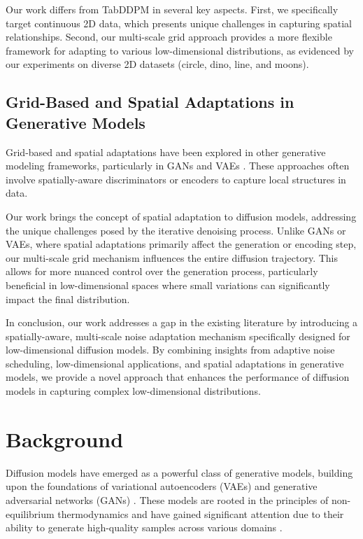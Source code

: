 \documentclass{article} %
\begin{document}
Our work differs from TabDDPM in several key aspects. First, we specifically target continuous 2D data, which presents unique challenges in capturing spatial relationships. Second, our multi-scale grid approach provides a more flexible framework for adapting to various low-dimensional distributions, as evidenced by our experiments on diverse 2D datasets (circle, dino, line, and moons).

\subsection{Grid-Based and Spatial Adaptations in Generative Models}

Grid-based and spatial adaptations have been explored in other generative modeling frameworks, particularly in GANs \cite{gan} and VAEs \cite{vae}. These approaches often involve spatially-aware discriminators or encoders to capture local structures in data.

Our work brings the concept of spatial adaptation to diffusion models, addressing the unique challenges posed by the iterative denoising process. Unlike GANs or VAEs, where spatial adaptations primarily affect the generation or encoding step, our multi-scale grid mechanism influences the entire diffusion trajectory. This allows for more nuanced control over the generation process, particularly beneficial in low-dimensional spaces where small variations can significantly impact the final distribution.

In conclusion, our work addresses a gap in the existing literature by introducing a spatially-aware, multi-scale noise adaptation mechanism specifically designed for low-dimensional diffusion models. By combining insights from adaptive noise scheduling, low-dimensional applications, and spatial adaptations in generative models, we provide a novel approach that enhances the performance of diffusion models in capturing complex low-dimensional distributions.

\section{Background}
\label{sec:background}

Diffusion models have emerged as a powerful class of generative models, building upon the foundations of variational autoencoders (VAEs) \cite{vae} and generative adversarial networks (GANs) \cite{gan}. These models are rooted in the principles of non-equilibrium thermodynamics \cite{pmlr-v37-sohl-dickstein15} and have gained significant attention due to their ability to generate high-quality samples across various domains \cite{ddpm}.
\end{document}
